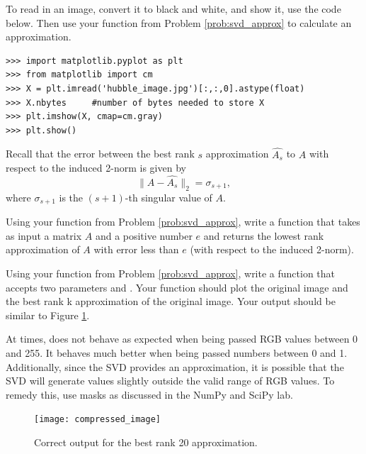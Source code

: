 To read in an image, convert it to black and white, and show it, use the code below.
Then use your function from Problem \ref{prob:svd_approx} to calculate an approximation.
\begin{lstlisting}
>>> import matplotlib.pyplot as plt
>>> from matplotlib import cm
>>> X = plt.imread('hubble_image.jpg')[:,:,0].astype(float)
>>> X.nbytes     #number of bytes needed to store X
>>> plt.imshow(X, cmap=cm.gray)
>>> plt.show()
\end{lstlisting}

Recall that the error between the best rank $s$ approximation $\widehat{A_s}$ to $A$ with respect to the induced 
2-norm is given by
$$
\|A - \widehat{A_s}\|_2 = \sigma_{s+1},
$$
where $\sigma_{s+1}$ is the $(s+1)$-th singular value of $A$. 

\begin{problem}
Using your  function from Problem \ref{prob:svd_approx}, write a function  that takes as input a matrix $A$ and a positive number $e$ and returns
the lowest rank approximation of $A$ with error less than $e$ (with respect to the induced 2-norm).
\end{problem}

\begin{problem}
Using your  function from Problem \ref{prob:svd_approx}, write a function  that accepts two parameters  and . Your function should plot the original image and the best rank k approximation of the original image. Your output should be similar to Figure \ref{fig:compressed_image}.

At times,  does not behave as expected when being passed RGB values between 0 and 255. It behaves much better when being passed numbers between 0 and 1. Additionally, since the SVD provides an approximation, it is possible that the SVD will generate values slightly outside the valid range of RGB values. To remedy this, use masks as discussed in the NumPy and SciPy lab. 

\begin{figure}[H]
\texttt{[image: compressed\_image]}
\caption{Correct output for the best rank 20 approximation.}
\label{fig:compressed_image}
\end{figure}
\end{problem}
